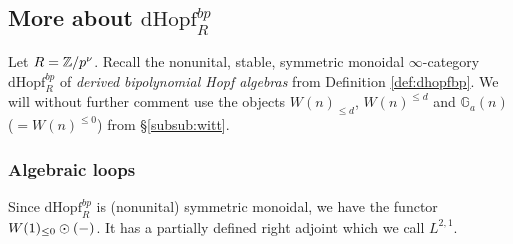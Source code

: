 \documentclass{amsart}
\numberwithin{proposition}{section}
\numberwithin{equation}{section}
\def\dHopf{\mathrm{dHopf}}
\newcommand{\Ga}{{\mathbb{G}_a}}
\def\hotimes{\odot}
\def\hLoops{L}
\begin{document}
\subsection{More about $\dHopf_R^{bp}$} \label{subsec:more-dHopf}
Let $R=\mathbb{Z}/p^\nu$.
Recall the nonunital, stable, symmetric monoidal $\infty$-category $\dHopf_R^{bp}$ of \emph{derived bipolynomial Hopf algebras} from Definition \ref{def:dhopfbp}.
We will without further comment use the objects $W(n)_{\le d}$, $W(n)^{\le d}$ and $\Ga(n)$ ($=W(n)^{\le 0}$) from \S\ref{subsub:witt}.

\subsubsection{Algebraic loops}
Since $\dHopf_R^{bp}$ is (nonunital) symmetric monoidal, we have the functor $W(1)_{\le 0} \hotimes (\ph)$.
It has a partially defined right adjoint which we call $\hLoops^{2,1}$.
\end{document}
